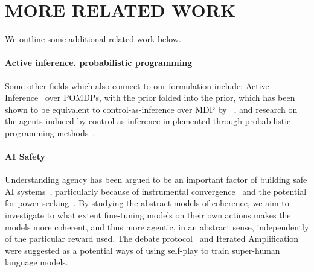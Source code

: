 \section{MORE RELATED WORK}

We outline some additional related work below.

\paragraph{Active inference. probabilistic programming} Some other fields which also connect to our formulation include: Active Inference~\citep{parr_active_2022} over POMDPs, with the prior folded into the prior, which has been shown to be equivalent to control-as-inference over MDP by ~\citet{millidge_relationship_2020}, and research on the agents induced by control as inference implemented through probabilistic programming methods~\citep{evans_modeling_2017}.

\paragraph{AI Safety} Understanding agency has been argued to be an important factor of building safe AI systems~\citep{carlsmith_is_2022, ngo_alignment_2022}, particularly because of instrumental convergence~\citep{omohundro_basic_2008, bostrom_superintelligent_2012} and the potential for power-seeking~\citep{krakovna_power-seeking_2023}. By studying the abstract models of coherence, we aim to investigate to what extent fine-tuning models on their own actions makes the models more coherent, and thus more agentic, in an abstract sense, independently of the particular reward used. The debate protocol~\citep{irving_ai_2018} and Iterated Amplification~\citep{christiano_supervising_2018} were suggested as a potential ways of using self-play to train super-human language models.